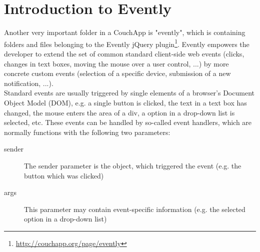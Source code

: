 \section{Introduction to Evently}
\label{couchapp:evently}
Another very important folder in a CouchApp is "evently", which is containing folders and files belonging to the Evently jQuery plugin\footnote{\url{http://couchapp.org/page/evently}}. Evently empowers the developer to extend the set of common standard client-side web events (clicks, changes in text boxes, moving the mouse over a user control, ...) by more concrete custom events (selection of a specific device, submission of a new notification, ...).\\
Standard events are usually triggered by single elements of a browser's Document Object Model (DOM), e.g. a single button is clicked, the text in a text box has changed, the mouse enters the area of a div, a option in a drop-down list is selected, etc. These events can be handled by so-called event handlers, which are normally functions with the following two parameters:
\begin{description}
\item[sender] The sender parameter is the object, which triggered the event (e.g. the button which was clicked)
\item[args] This parameter may contain event-specific information (e.g. the selected option in a drop-down list)
\end{description}
